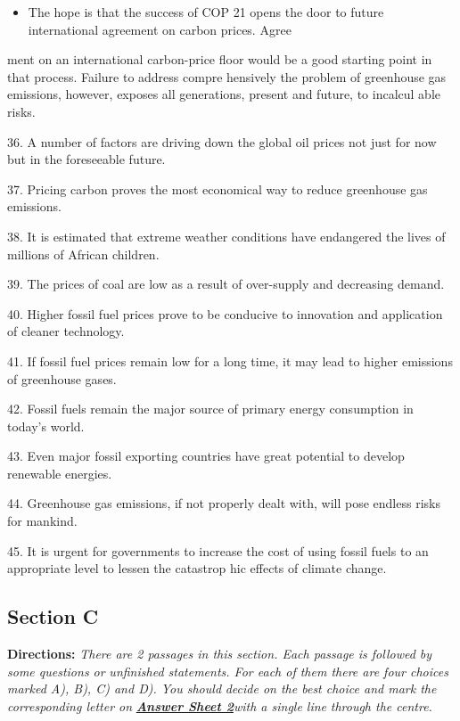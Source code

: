 \documentclass[UTF8,11pt]{ctexart}
\begin{document}
\begin{itemize}[leftmargin=2em,itemsep=.2em,topsep=.4em]\item[O.] The hope is that the success of COP 21 opens the door to future international agreement on carbon prices. Agree
\end{itemize}

ment on an international carbon-price floor would be a good starting point in that process. Failure to address compre hensively the problem of greenhouse gas emissions, however, exposes all generations, present and future, to incalcul able risks.


36. A number of factors are driving down the global oil prices not just for now but in the foreseeable future.


37. Pricing carbon proves the most economical way to reduce greenhouse gas emissions.


38. It is estimated that extreme weather conditions have endangered the lives of millions of African children.


39. The prices of coal are low as a result of over-supply and decreasing demand.


40. Higher fossil fuel prices prove to be conducive to innovation and application of cleaner technology.


41. If fossil fuel prices remain low for a long time, it may lead to higher emissions of greenhouse gases.


42. Fossil fuels remain the major source of primary energy consumption in today's world.


43. Even major fossil exporting countries have great potential to develop renewable energies.


44. Greenhouse gas emissions, if not properly dealt with, will pose endless risks for mankind.


45. It is urgent for governments to increase the cost of using fossil fuels to an appropriate level to lessen the catastrop hic effects of climate change.


\subsection*{\textbf{Section C}}


\textbf{Directions:}\textit{ There are 2 passages in this section. Each passage is followed by some questions or} \textit{unfinished statements. For each of them there are four choices marked A), B), C) and D). You should} \textit{decide on the best choice and mark the corresponding letter on}\textbf{\textit{ }}\textbf{\textit{\uline{Answer Sheet 2}}}\textit{with a single line} \textit{through the centre.}
\end{document}
